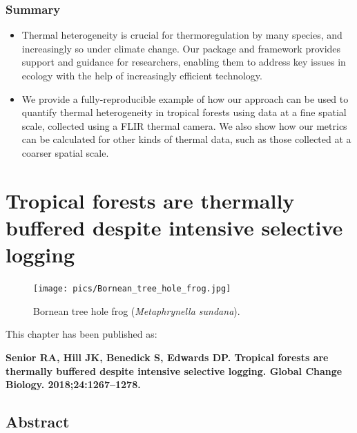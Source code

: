 \documentclass[12pt,a4paper,]{report}
\providecommand{\tightlist}{%
  \setlength{\itemsep}{0pt}\setlength{\parskip}{0pt}}
\theoremstyle{definition}
\theoremstyle{definition}
\theoremstyle{definition}
\theoremstyle{remark}
\begin{document}
\subsection{Summary}\label{summary}

\begin{itemize}
\tightlist
\item
  Thermal heterogeneity is crucial for thermoregulation by many species,
  and increasingly so under climate change. Our package and framework
  provides support and guidance for researchers, enabling them to
  address key issues in ecology with the help of increasingly efficient
  technology.
\item
  We provide a fully-reproducible example of how our approach can be
  used to quantify thermal heterogeneity in tropical forests using data
  at a fine spatial scale, collected using a FLIR thermal camera. We
  also show how our metrics can be calculated for other kinds of thermal
  data, such as those collected at a coarser spatial scale.
\end{itemize}

\chapter{Tropical forests are thermally buffered despite intensive
selective
logging}\label{tropical-forests-are-thermally-buffered-despite-intensive-selective-logging}

\begin{figure}[!htb]
\centering
\texttt{[image: pics/Bornean\_tree\_hole\_frog.jpg]}
\caption*{Bornean tree hole frog (\textit{Metaphrynella sundana}).}
\end{figure}

This chapter has been published as:

\textbf{Senior RA, Hill JK, Benedick S, Edwards DP. Tropical forests are
thermally buffered despite intensive selective logging. Global Change
Biology. 2018;24:1267--1278.}

\pagebreak

\section{Abstract}\label{abstract-3}
\end{document}
